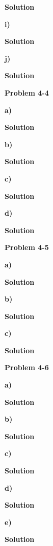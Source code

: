 \documentclass{article}
\begin{document}
\medskip

\textbf{Solution}

\medskip

\textbf{i)}

\medskip

\textbf{Solution}

\medskip

\textbf{j)}

\medskip

\textbf{Solution}

\hrulefill

\medskip

\textbf{Problem 4-4} 

\medskip

\textbf{a)}

\medskip

\textbf{Solution}

\medskip

\textbf{b)}

\medskip

\textbf{Solution}

\medskip

\textbf{c)}

\medskip

\textbf{Solution}

\medskip

\textbf{d)}

\medskip

\textbf{Solution}

\hrulefill

\medskip

\textbf{Problem 4-5} 

\medskip

\textbf{a)}

\medskip

\textbf{Solution}

\medskip

\textbf{b)}

\medskip

\textbf{Solution}

\medskip

\textbf{c)}

\medskip

\textbf{Solution}

\hrulefill

\medskip

\textbf{Problem 4-6} 

\medskip

\textbf{a)}

\medskip

\textbf{Solution}

\medskip

\textbf{b)}

\medskip

\textbf{Solution}

\medskip

\textbf{c)}

\medskip

\textbf{Solution}

\medskip

\textbf{d)}

\medskip

\textbf{Solution}

\medskip

\textbf{e)}

\medskip

\textbf{Solution}

\hrulefill
\end{document}
